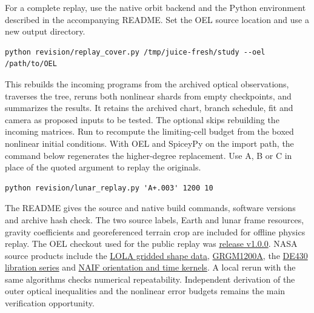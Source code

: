 \documentclass[10pt,letterpaper]{article}
\newcommand{\file}[1]{\texttt{\detokenize{#1}}}
\begin{document}
For a complete replay, use the native orbit backend and the Python environment described in the accompanying README. Set the OEL source location and use a new output directory.
\begin{verbatim}
python revision/replay_cover.py /tmp/juice-fresh/study --oel /path/to/OEL
\end{verbatim}
This rebuilds the incoming programs from the archived optical observations, traverses the tree, reruns both nonlinear shards from empty checkpoints, and summarizes the results. It retains the archived chart, branch schedule, fit and camera as proposed inputs to be tested. The optional \file{--frozen-optics} skips rebuilding the incoming matrices. Run \file{revision/worked_cell.py} to recompute the limiting-cell budget from the boxed nonlinear initial conditions. With OEL and SpiceyPy on the import path, the command below regenerates the higher-degree replacement. Use A, B or C in place of the quoted argument to replay the originals.
\begin{verbatim}
python revision/lunar_replay.py 'A+.003' 1200 10
\end{verbatim}

The README gives the source and native build commands, software versions and archive hash check. The two source labels, Earth and lunar frame resources, gravity coefficients and georeferenced terrain crop are included for offline physics replay. The OEL checkout used for the public replay was \href{https://github.com/adamcohen8/orbital-engineering-lab/tree/108aa6412e6875bbfa5d9741ebee7200b362badc}{release v1.0.0}. NASA source products include the \href{https://pds-geosciences.wustl.edu/missions/lro/lola.htm}{LOLA gridded shape data}, \href{https://pgda.gsfc.nasa.gov/products/50}{GRGM1200A}, the \href{https://ssd.jpl.nasa.gov/ftp/eph/planets/ascii/de430/}{DE430 libration series} and \href{https://naif.jpl.nasa.gov/pub/naif/generic_kernels/}{NAIF orientation and time kernels}. A local rerun with the same algorithms checks numerical repeatability. Independent derivation of the outer optical inequalities and the nonlinear error budgets remains the main verification opportunity.
\end{document}
